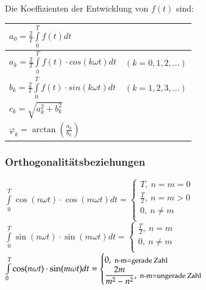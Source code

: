 \begin{minipage}{0.5\linewidth}
    Die Koeffizienten der Entwicklung von $f(t)$ sind: \vfill
    \begin{tabular}{|ll|}
        \hline
        $a_{0} = \frac{2}{T}\int\limits_{0}^{T}f(t)dt$ & \\
        \hline
        $a_{k} = \frac{2}{T}\int\limits_{0}^{T}f(t) \cdot cos(k \omega t)dt$   &
         $(k = 0,1,2,...)$\\
        \hline
        $b_{k} = \frac{2}{T}\int\limits_{0}^{T}f(t) \cdot sin(k \omega t)dt$   &
         $(k = 1,2,3,...)$\\
        \hline
        $c_{k} = \sqrt{a_k^2 + b_k^2}$ &\\
        \hline
        $\varphi_k = \arctan(\frac{a_k}{b_k}) $&\\
        \hline
    \end{tabular}
\end{minipage}
\begin{minipage}{0.5\linewidth}
    \subsubsection{Orthogonalitätsbeziehungen}
    $\int\limits_0^T \cos(n\omega t)\cdot \cos(m\omega t)dt=
    \begin{cases}
    T,\ n=m=0\\
    \frac{T}{2},\ n=m>0\\ 
    0,\ n\neq m\\
    \end{cases}$\\
    
    
    $\int\limits_0^T \sin(n\omega t)\cdot \sin(m\omega t)dt=
    \begin{cases}
    \frac{T}{2},\ n=m\\
    0,\ n\neq m\\
    \end{cases}$\\
    $\int\limits_0^T \cos(n\omega t)\cdot \sin(m\omega t)dt=
    \begin{cases}
    0,\ \text{\footnotesize n-m=gerade Zahl}\\
    \dfrac{2m}{m^2-n^2},\ \text{{\footnotesize n-m=ungerade Zahl}}\\
    \end{cases}$
\end{minipage}

